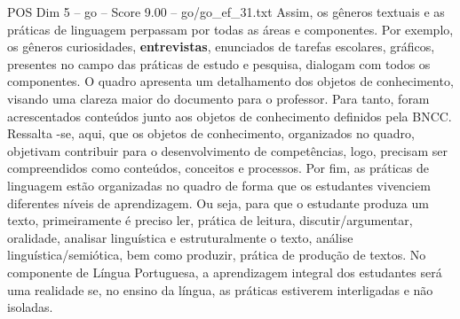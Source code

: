 \begin{textsample}{POS Dim 5 – go – Score 9.00 – go/go\_ef\_31.txt}
Assim, os gêneros textuais e as práticas de linguagem perpassam por todas as áreas e componentes.
Por exemplo, os gêneros curiosidades, \textbf{entrevistas}, enunciados de tarefas escolares, gráficos, presentes no campo das práticas de estudo e pesquisa, dialogam com todos os componentes.
O quadro apresenta um detalhamento dos objetos de conhecimento, visando uma clareza maior do documento para o professor.
Para tanto, foram acrescentados conteúdos junto aos objetos de conhecimento definidos pela BNCC.
Ressalta -se, aqui, que os objetos de conhecimento, organizados no quadro, objetivam contribuir para o desenvolvimento de competências, logo, precisam ser compreendidos como conteúdos, conceitos e processos.
Por fim, as práticas de linguagem estão organizadas no quadro de forma que os estudantes vivenciem diferentes níveis de aprendizagem.
Ou seja, para que o estudante produza um texto, primeiramente é preciso ler, prática de leitura, discutir/argumentar, oralidade, analisar linguística e estruturalmente o texto, análise linguística/semiótica, bem como produzir, prática de produção de textos.
No componente de Língua Portuguesa, a aprendizagem integral dos estudantes será uma realidade se, no ensino da língua, as práticas estiverem interligadas e não isoladas.

\end{textsample}
